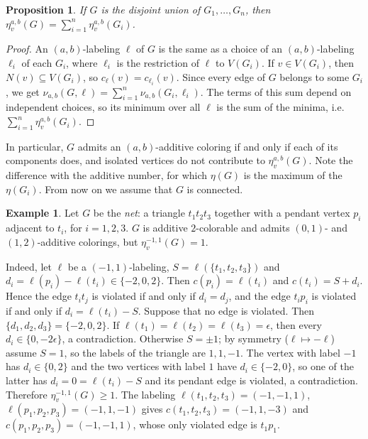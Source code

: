 \documentclass[a4paper,11pt]{article}
\newcommand{\ie}{{i.e.~}}
\newcommand{\etav}{\eta_v^{a,b}}
\newtheorem{prop}{Proposition}
\theoremstyle{definition}
\newtheorem{ex}{Example}
\begin{document}
\begin{prop} \label{PCOMP}
If $G$ is the disjoint union of $G_1, \ldots, G_n$, then $\etav(G) = \sum_{i=1}^{n} \etav(G_i)$.
\end{prop}
\begin{proof}
An $(a,b)$-labeling $\ell$ of $G$ is the same as a choice of an $(a,b)$-labeling $\ell_i$ of each $G_i$, where $\ell_i$ is the
restriction of $\ell$ to $V(G_i)$. If $v \in V(G_i)$, then $N(v) \subseteq V(G_i)$, so $c_\ell(v) = c_{\ell_i}(v)$. Since every
edge of $G$ belongs to some $G_i$, we get $\nu_{a,b}(G,\ell) = \sum_{i=1}^{n} \nu_{a,b}(G_i,\ell_i)$. The terms of this sum
depend on independent choices, so its minimum over all $\ell$ is the sum of the minima, \ie $\sum_{i=1}^{n} \etav(G_i)$.
\end{proof}

In particular, $G$ admits an $(a,b)$-additive coloring if and only if each of its components does, and isolated vertices
do not contribute to $\etav(G)$. Note the difference with the additive number, for which $\eta(G)$ is the maximum of the
$\eta(G_i)$. From now on we assume that $G$ is connected.

\begin{ex} \label{EXNET}
Let $G$ be the \emph{net}: a triangle $t_1 t_2 t_3$ together with a pendant vertex $p_i$ adjacent to $t_i$, for $i = 1, 2, 3$.
$G$ is additive $2$-colorable and admits $(0,1)$- and $(1,2)$-additive colorings, but $\eta_v^{-1,1}(G) = 1$.

Indeed, let $\ell$ be a $(-1,1)$-labeling, $S = \ell(\{t_1,t_2,t_3\})$ and $d_i = \ell(p_i) - \ell(t_i) \in \{-2,0,2\}$.
Then $c(p_i) = \ell(t_i)$ and $c(t_i) = S + d_i$. Hence the edge $t_it_j$ is violated if and only if $d_i = d_j$,
and the edge $t_ip_i$ is violated if and only if $d_i = \ell(t_i) - S$.
Suppose that no edge is violated. Then $\{d_1, d_2, d_3\} = \{-2, 0, 2\}$. If $\ell(t_1) = \ell(t_2) = \ell(t_3) = \epsilon$, then
every $d_i \in \{0, -2\epsilon\}$, a contradiction. Otherwise $S = \pm 1$; by symmetry ($\ell \mapsto -\ell$) assume $S = 1$, so
the labels of the triangle are $1, 1, -1$. The vertex with label $-1$ has $d_i \in \{0, 2\}$ and the two vertices with
label $1$ have $d_i \in \{-2, 0\}$, so one of the latter has $d_i = 0 = \ell(t_i) - S$ and its pendant edge is violated,
a contradiction. Therefore $\eta_v^{-1,1}(G) \geq 1$. The labeling $\ell(t_1,t_2,t_3) = (-1,-1,1)$, $\ell(p_1,p_2,p_3) = (-1,1,-1)$
gives $c(t_1,t_2,t_3) = (-1,1,-3)$ and $c(p_1,p_2,p_3) = (-1,-1,1)$, whose only violated edge is $t_1p_1$.
\end{ex}
\end{document}
